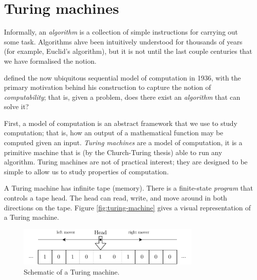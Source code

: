 \section{Turing machines}

Informally, an \emph{algorithm} is a collection of simple instructions for carrying out some task. Algorithms ahve been intuitively understood for thousands of years (for example, Euclid's algorithm), but it is not until the last couple centuries that we have formalised the notion. 

\textcite{turingComputableNumbersApplication1936} defined the now ubiquitous sequential model of computation in 1936, with the primary motivation behind his construction to capture the notion of \emph{computability}; that is, given a problem, does there exist an \emph{algorithm} that can solve it?

First, a model of computation is an abstract framework that we use to study computation; that is, how an output of a mathematical function may be computed given an input. \emph{Turing machines} are a model of computation, it is a primitive machine that is (by the Church-Turing thesis) able to run any algorithm. Turing machines are not of practical interest; they are designed to be simple to allow us to study properties of computation.

A Turing machine has infinite tape (memory). There is a finite-state \emph{program} that controls a tape head. The head can read, write, and move around in both directions on the tape. Figure \ref{fig:turing-machine} gives a visual representation of a Turing machine.


\begin{figure}
  \centering
  \includegraphics[width=0.8\textwidth]{content/3-complexity/images/turing-machine}
  \caption{Schematic of a Turing machine.}
\end{figure}


